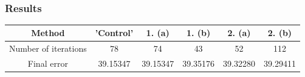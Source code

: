 \documentclass{article}
\begin{document}
\\

\subsubsection*{Results}

\begin{center}
\begin{tabular}{ |c|c|c|c|c|c| } 
 \hline
 Method & 'Control' & 1. (a) & 1. (b) & 2. (a) & 2. (b) \\ 
 \hline
 Number of iterations & 78 & 74 & 43 & 52 & 112 \\
 \hline
 Final error & 39.15347 & 39.15347 & 39.35176 & 39.32280 & 39.29411 \\
 \hline
\end{tabular}
\end{center}
\end{document}
